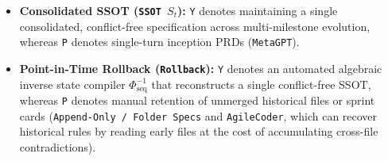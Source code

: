 \documentclass[11pt,a4paper,copyright]{google}
\begin{document}
\begin{itemize}[leftmargin=1.5em,itemsep=1.5pt,topsep=2pt]
  \item \textbf{Consolidated SSOT (\texttt{SSOT $S_t$}):} \texttt{Y} denotes maintaining a single consolidated, conflict-free specification across multi-milestone evolution, whereas \texttt{P} denotes single-turn inception PRDs (\texttt{MetaGPT}).
  \item \textbf{Point-in-Time Rollback (\texttt{Rollback}):} \texttt{Y} denotes an automated algebraic inverse state compiler $\Phi_{\text{seq}}^{-1}$ that reconstructs a single conflict-free SSOT, whereas \texttt{P} denotes manual retention of unmerged historical files or sprint cards (\texttt{Append-Only / Folder Specs} and \texttt{AgileCoder}, which can recover historical rules by reading early files at the cost of accumulating cross-file contradictions).
\end{itemize}
\end{document}
